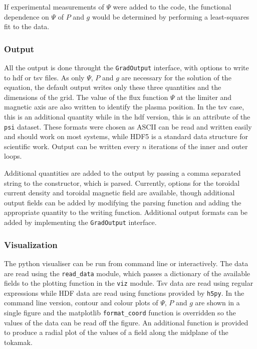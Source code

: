 \documentclass[paper=letter, fontsize=11pt]{scrartcl} %
\begin{document}
If experimental measurements of $\Psi$ were added to the code, the functional dependence on $\Psi$ of $P$ and $g$ would be determined by performing a least-squares fit to the data. 

\subsubsection{Output}
All the output is done throught the \texttt{GradOutput} interface, with options to write to hdf or tsv files. As only $\Psi$, $P$ and $g$ are necessary for the solution of the equation, the default output writes only these three quantities and the dimensions of the grid. The value of the flux function $\Psi$ at the limiter and magnetic axis are also written to identify the plasma position. In the tsv case, this is an additional quantity while in the hdf version, this is an attribute of the \texttt{psi} dataset. These formats were chosen as ASCII can be read and written easily and should work on most systems, while HDF5 is a standard data structure for scientific work. Output can be written every $n$ iterations of the inner and outer loops. 

Additional quantities are added to the output by passing a comma separated string to the constructor, which is parsed. Currently, options for the toroidal current density and toroidal magnetic field are available, though additional output fields can be added by modifying the parsing function and adding the appropriate quantity to the writing function. Additional output formats can be added by implementing the \texttt{GradOutput} interface.

\subsubsection{Visualization}

The python visualiser can be run from command line or interactively. The data are read using the \texttt{read\_data} module, which passes a dictionary of the available fields to the plotting function in the \texttt{viz} module. Tsv data are read using regular expressions while HDF data are read using functions provided by \texttt{h5py}. In the command line version, contour and colour plots of $\Psi$, $P$ and $g$ are shown in a single figure and the matplotlib \texttt{format\_coord} function is overridden so the values of the data can be read off the figure. An additional function is provided to produce a radial plot of the values of a field along the midplane of the tokamak. 
\end{document}
